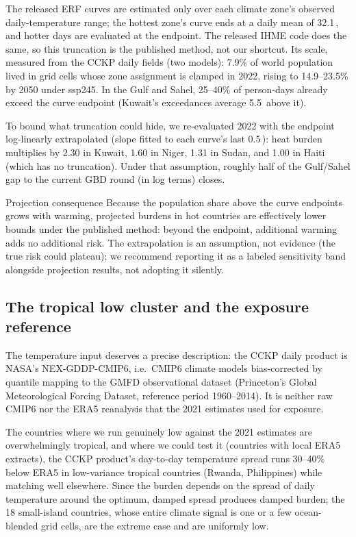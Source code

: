 \documentclass[11pt]{ozreport}
\begin{document}
The released ERF curves are estimated only over each climate zone's observed
daily-temperature range; the hottest zone's curve ends at a daily mean of
32.1\,\textcelsius, and hotter days are evaluated at the endpoint. The
released IHME code does the same, so this truncation is the published
method, not our shortcut. Its scale, measured from the CCKP daily fields
(two models): 7.9\% of world population lived in grid cells whose zone
assignment is clamped in 2022, rising to 14.9--23.5\% by 2050 under ssp245.
In the Gulf and Sahel, 25--40\% of person-days already exceed the curve
endpoint (Kuwait's exceedances average 5.5\,\textcelsius{} above it).

To bound what truncation could hide, we re-evaluated 2022 with the endpoint
log-linearly extrapolated (slope fitted to each curve's last
0.5\,\textcelsius): heat burden multiplies by 2.30 in Kuwait, 1.60 in
Niger, 1.31 in Sudan, and 1.00 in Haiti (which has no truncation). Under
that assumption, roughly half of the Gulf/Sahel gap to the current GBD
round (in log terms) closes.

\begin{ozcaveat}{Projection consequence}
Because the population share above the curve endpoints grows with warming,
projected burdens in hot countries are effectively lower bounds under the
published method: beyond the endpoint, additional warming adds no
additional risk. The extrapolation is an assumption, not evidence
(the true risk could plateau); we recommend reporting it as a labeled
sensitivity band alongside projection results, not adopting it silently.
\end{ozcaveat}

\subsection{The tropical low cluster and the exposure reference}

The temperature input deserves a precise description: the CCKP daily
product is NASA's NEX-GDDP-CMIP6, i.e.\ CMIP6 climate models bias-corrected
by quantile mapping to the GMFD observational dataset (Princeton's Global
Meteorological Forcing Dataset, reference period 1960--2014). It is neither
raw CMIP6 nor the ERA5 reanalysis that the 2021 estimates used for
exposure.

The countries where we run genuinely low against the 2021 estimates are
overwhelmingly tropical, and where we could test it (countries with local
ERA5 extracts), the CCKP product's day-to-day temperature spread runs
30--40\% below ERA5 in low-variance tropical countries (Rwanda,
Philippines) while matching well elsewhere. Since the burden depends on
the spread of daily temperature around the optimum, damped spread produces
damped burden; the 18 small-island countries, whose entire climate signal
is one or a few ocean-blended grid cells, are the extreme case and are
uniformly low.
\end{document}
